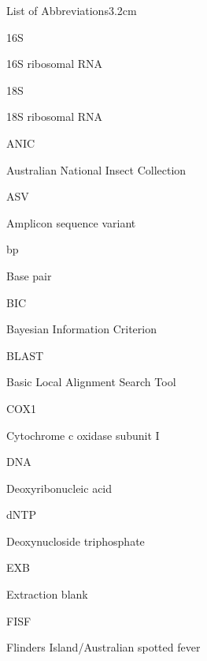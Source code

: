 \documentclass[a4paper, nobind]{templates/ociamthesis}
\begin{document}
\begin{romanpages}
\listoffigures
	\mtcaddchapter

\listoftables
  \mtcaddchapter
\begin{mclistof}{List of Abbreviations}{3.2cm}

\item[16S]

16S ribosomal RNA

\item[18S]

18S ribosomal RNA

\item[ANIC]

Australian National Insect Collection

\item[ASV]

Amplicon sequence variant

\item[bp]

Base pair

\item[BIC]

Bayesian Information Criterion

\item[BLAST]

Basic Local Alignment Search Tool

\item[COX1]

Cytochrome c oxidase subunit I

\item[DNA]

Deoxyribonucleic acid

\item[dNTP]

Deoxynucloside triphosphate

\item[EXB]

Extraction blank

\item[FISF]

Flinders Island/Australian spotted fever


\end{mclistof}
\end{romanpages}
\end{document}
